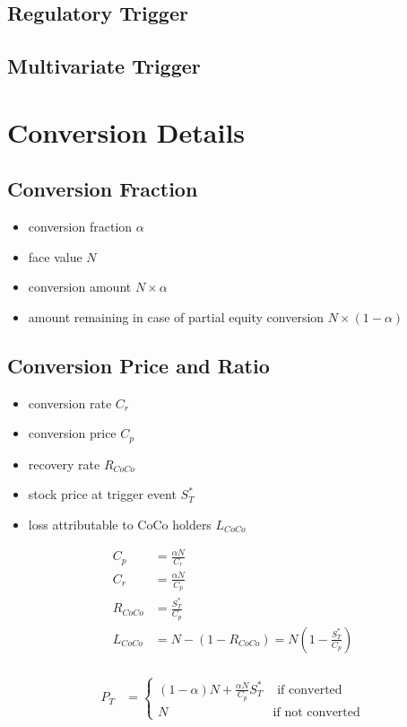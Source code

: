 \subsection{Regulatory Trigger}

\subsection{Multivariate Trigger}

\section{Conversion Details}

\subsection{Conversion Fraction}

\begin{itemize}
    \item conversion fraction $\alpha$
    \item face value $N$
    \item conversion amount $N \times \alpha$
    \item amount remaining in case of partial equity conversion $N \times (1-\alpha)$
\end{itemize}

\subsection{Conversion Price and Ratio}
\begin{itemize}
    \item conversion rate $C_r$
    \item conversion price $C_p$
    \item recovery rate $R_{CoCo}$
    \item stock price at trigger event $S_T^{*}$
    \item loss attributable to CoCo holders $L_{CoCo}$
\end{itemize}

\begin{align}
    C_p &= \frac{\alpha N}{C_r}\\
    C_r &= \frac{\alpha N}{C_p}\\
    R_{CoCo} &= \frac{S_T^{*} }{C_p}\\
    L_{CoCo} &= N - ( 1 - R_{CoCo}) = N \left( 1 - \frac{S_T^{*}}{C_p} \right)\\
\end{align}

\begin{align}\label{valueatmaturity}
    P_T &= \begin{cases} (1 - \alpha) N + \frac{\alpha N}{C_p} S_T^{*} & \text{ if converted} \\ N & \text{if not converted} \end{cases}
\end{align}

